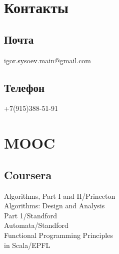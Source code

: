 \documentclass[a4paper]{curricula-vitae}
\begin{document}




\begin{minipage}[t]{0.33\textwidth} %

\section{Контакты} 

\subsection{Почта}
igor.sysoev.main@gmail.com

\insertspace

\subsection{Телефон}
+7(915)388-51-91


\insertspace

\section{MOOC}

\subsection{Coursera}
Algorithms, Part I and II/Princeton \\
Algorithms: Design and Analysis \\
Part 1/Standford \\
Automata/Standford \\
Functional Programming Principles \\
in Scala/EPFL


\end{minipage}
\end{document}
